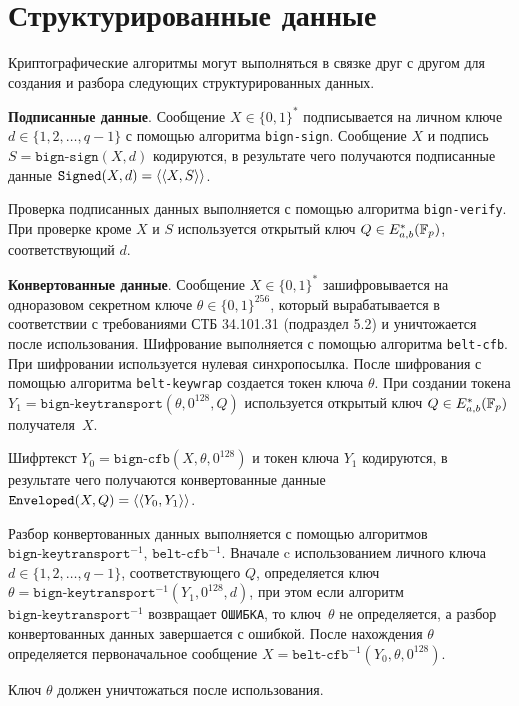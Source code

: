 \section{Структурированные данные}\label{CRYPTO.SignedEnveloped}

Криптографические алгоритмы могут выполняться в связке друг с другом для 
создания и разбора следующих структурированных данных.

{\bf Подписанные данные}.
Сообщение $X \in\{0, 1\}^*$ подписывается на личном ключе 
$d \in\{1, 2,\ldots, q-1\}$ с помощью алгоритма \texttt{bign-sign}.
Сообщение $X$ и подпись $S = \texttt{bign-sign}(X, d)$ кодируются, 
в результате чего получаются подписанные 
данные $\texttt{Signed}(X, d) = \langle\langle X, S \rangle\rangle$.

Проверка подписанных данных выполняется с помощью алгоритма \texttt{bign-verify}.
При проверке кроме $X$ и $S$ используется открытый ключ $Q \in E_{a,b}^*({\mathbb F}_p)$, 
соответствующий $d$.

{\bf Конвертованные данные}.
Сообщение $X\in\{0,1\}^*$ зашифровывается на 
одноразовом секретном ключе $\theta\in\{0,1\}^{256}$, который вырабатывается в 
соответствии с требованиями СТБ 34.101.31 (подраздел 5.2) и уничтожается после 
использования. Шифрование выполняется с помощью алгоритма \texttt{belt-cfb}. При 
шифровании используется нулевая синхропосылка. После шифрования с помощью 
алгоритма \texttt{belt-keywrap} создается токен ключа $\theta$.
При создании токена $Y_1 = \texttt{bign-keytransport}(\theta, 0^{128}, Q)$ 
используется открытый ключ $Q \in E_{a,b}^*({\mathbb F}_p)$ получателя~$X$.

Шифртекст $Y_0 = \texttt{bign-cfb}(X, \theta, 0^{128})$ и токен ключа $Y_1$ 
кодируются, в результате чего получаются конвертованные данные 
$\texttt{Enveloped}(X, Q) = \langle\langle Y_0, Y_1\rangle\rangle$.

Разбор конвертованных данных выполняется с помощью алгоритмов 
$\texttt{bign-keytransport}^{-1}$, $\texttt{belt-cfb}^{-1}$. Вначале c 
использованием личного ключа $d \in\{1, 2,\ldots, q-1\}$, 
соответствующего $Q$, определяется ключ 
$\theta = \texttt{bign-keytransport}^{-1}(Y_1, 0^{128}, d)$, 
при этом если алгоритм~$\texttt{bign-keytransport}^{-1}$ возвращает \texttt{ОШИБКА}, 
то ключ~$\theta$ не определяется, а разбор конвертованных данных завершается с 
ошибкой. После нахождения $\theta$ определяется первоначальное сообщение 
$X = \texttt{belt-cfb}^{-1}(Y_0, \theta, 0^{128})$.

Ключ $\theta$ должен уничтожаться после использования.

